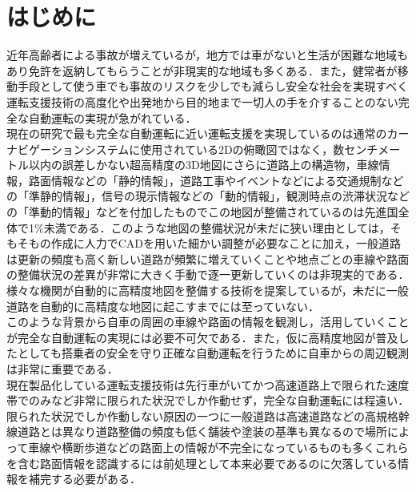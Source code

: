 \documentclass[a4j, 11pt]{jreport}
\begin{document}

\newpage
\tableofcontents       %
\thispagestyle{empty}  %
\pagebreak
{} %


\chapter{はじめに}
近年高齢者による事故が増えているが，地方では車がないと生活が困難な地域もあり免許を返納してもらうことが非現実的な地域も多くある．また，健常者が移動手段として使う車でも事故のリスクを少しでも減らし安全な社会を実現すべく運転支援技術の高度化や出発地から目的地まで一切人の手を介することのない完全な自動運転の実現が急がれている．\\
\indent 現在の研究で最も完全な自動運転に近い運転支援を実現しているのは通常のカーナビゲーションシステムに使用されている2Dの俯瞰図ではなく，数センチメートル以内の誤差しかない超高精度の3D地図にさらに道路上の構造物，車線情報，路面情報などの「静的情報」，道路工事やイベントなどによる交通規制などの「準静的情報」，信号の現示情報などの「動的情報」，観測時点の渋滞状況などの「準動的情報」などを付加したものでこの地図が整備されているのは先進国全体で1\%未満である．このような地図の整備状況が未だに狭い理由としては，そもそもの作成に人力でCADを用いた細かい調整が必要なことに加え，一般道路は更新の頻度も高く新しい道路が頻繁に増えていくことや地点ごとの車線や路面の整備状況の差異が非常に大きく手動で逐一更新していくのは非現実的である．様々な機関が自動的に高精度地図を整備する技術を提案しているが，未だに一般道路を自動的に高精度な地図に起こすまでには至っていない．\cite{tri-ad}\cite{autolab}\\
\indent このような背景から自車の周囲の車線や路面の情報を観測し，活用していくことが完全な自動運転の実現には必要不可欠である．また，仮に高精度地図が普及したとしても搭乗者の安全を守り正確な自動運転を行うために自車からの周辺観測は非常に重要である．\\
\indent 現在製品化している運転支援技術は先行車がいてかつ高速道路上で限られた速度帯でのみなど非常に限られた状況でしか作動せず，完全な自動運転には程遠い．限られた状況でしか作動しない原因の一つに一般道路は高速道路などの高規格幹線道路とは異なり道路整備の頻度も低く舗装や塗装の基準も異なるので場所によって車線や横断歩道などの路面上の情報が不完全になっているものも多くこれらを含む路面情報を認識するには前処理として本来必要であるのに欠落している情報を補完する必要がある．\cite{road_design}\\
\end{document}
